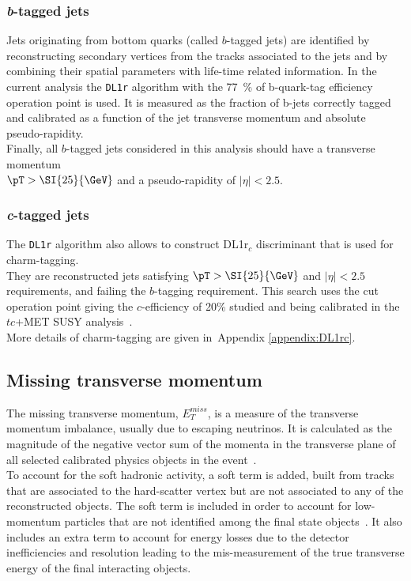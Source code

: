 \subsubsection {\textit{b}-tagged jets}
\label{sec:object:bjet}
Jets originating from bottom quarks (called $b$-tagged jets) are
identified by reconstructing secondary vertices from the tracks
associated to the jets and by combining their spatial parameters with
life-time related information.
In the current analysis the \texttt{DL1r} algorithm with the \SI{77}{\%} of b-quark-tag efficiency operation point is used. It is measured as the fraction of b-jets correctly tagged and calibrated as a function of the jet transverse momentum and absolute pseudo-rapidity.\\
Finally, all $b$-tagged jets considered in this analysis should have a transverse
momentum\\ $\pT >\SI{25}{\GeV}$ and a pseudo-rapidity of
$|\eta|\!<\!2.5$.  
\subsubsection {\textit{c}-tagged jets}
\label{sec:object:cjet}
The \texttt{DL1r} algorithm also allows to construct DL1r$_{c}$ discriminant that is used for charm-tagging.\\
They are reconstructed jets satisfying $\pT > \SI{25}{\GeV}$ and $|\eta| < 2.5$ requirements,
and failing the $b$-tagging requirement.
This search uses the cut operation point giving the $c$-efficiency of 20\% studied and being calibrated
in the $tc$+MET SUSY analysis~\cite{ANA-SUSY-2019-23}.\\
More details of charm-tagging are given in~Appendix \ref{appendix:DL1rc}.

\subsection{Missing transverse momentum}
\label{sec:object:met}
The missing transverse momentum, $E^{miss}_{T}$, is a measure of the transverse momentum
imbalance, usually due to escaping neutrinos. 
It is calculated as the magnitude of the negative vector sum of the momenta 
in the transverse plane of all selected calibrated physics objects in the event~\cite{MTM1,MTM2}. \\
To account for the soft hadronic activity, a soft term is added, built from
tracks that are associated to the hard-scatter vertex but are not
associated to any of the reconstructed objects. The soft term is
included in order to account for low-momentum particles that are not
identified among the final state objects~\cite{PERF-2011-07,PERF-2014-04,ATL-PHYS-PUB-2015-027}.
It also includes an extra term to account for energy losses due to the detector inefficiencies 
and resolution leading to the mis-measurement of the true transverse energy of the final 
interacting objects.

